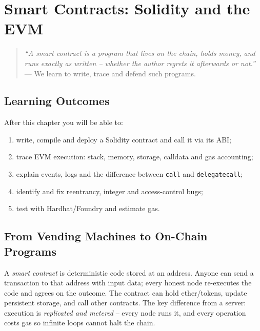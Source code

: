 \chapter{Smart Contracts: Solidity and the EVM}\label{ch:contracts}

\begin{quote}
\emph{``A smart contract is a program that lives on the chain, holds money, and runs exactly as written -- whether the author regrets it afterwards or not.''} --- We learn to write, trace and defend such programs.
\end{quote}

\noindent{}
\vspace{0.4em}

\section*{Learning Outcomes}
After this chapter you will be able to:
\begin{enumerate}[label=(L\arabic*)]
    \item write, compile and deploy a Solidity contract and call it via its ABI;
    \item trace EVM execution: stack, memory, storage, calldata and gas accounting;
    \item explain events, logs and the difference between \texttt{call} and \texttt{delegatecall};
    \item identify and fix reentrancy, integer and access-control bugs;
    \item test with Hardhat/Foundry and estimate gas.
\end{enumerate}

\section{From Vending Machines to On-Chain Programs}\label{sec:vending}
A \emph{smart contract} is deterministic code stored at an address. Anyone can send a transaction to that address with input data; every honest node re-executes the code and agrees on the outcome. The contract can hold ether/tokens, update persistent storage, and call other contracts. The key difference from a server: execution is \emph{replicated and metered} -- every node runs it, and every operation costs gas so infinite loops cannot halt the chain.

